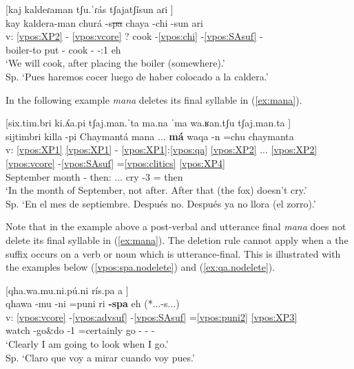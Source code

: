 \documentclass[output=paper]{langscibook}
\begin{document}
\ea \label{ex:spa}
    [kaj kaldeɾaman tʃu.ˈɾás tʃajatʃísun aɾi \downarrow] \\
    \glll {} kay kaldera-man churá -s\sout{pa} chaya -chi -sun ari \\
    v: \ref{vpos:XP2} - \ref{vpos:vcore} ? cook -\ref{vpos:chi} -\ref{vpos:SAsuf} - \\
    {} \Dem{} boiler-to put -\Gerund{} cook -\Caus{} -\Fut{}:1\Pl{} eh \\
    \glt  `We will cook, after placing the boiler (somewhere).'	\\ Sp. `Pues haremos cocer luego de haber colocado a la caldera.'
\z 

In the following example \textit{mana} deletes its final syllable in (\ref{ex:mana}).

\largerpage
\ea \label{ex:mana}
    [six.tim.bri ki.ʎa.pi tʃaj.man.ˈta ma.na ˈma wa.ʁan.tʃu tʃaj.man.ta \downarrow] \\ 
    \glll {} sijtimbri killa -pi Chaymantá mana ... \textbf{má} waqa -n =chu 		chaymanta  \\
    v: \ref{vpos:XP1} \ref{vpos:XP1} - \ref{vpos:XP1}:\ref{vpos:qa} \ref{vpos:XP2} ... \ref{vpos:XP2} \ref{vpos:vcore} -\ref{vpos:SAsuf} =\ref{vpos:clitics} \ref{vpos:XP4} \\
    {} September month -\Loc{} then:\Top{} \Neg{} ... \textbf{\Neg{}} cry -3\Sg{} =\Neg{} then \\
    \glt `In the month of   September, not after. After that (the fox) doesn't cry.' \\ Sp. `En el mes de septiembre. Después no. Después ya no llora (el zorro).'
\z 

Note that in the example above a post-verbal and utterance final \textit{mana} does not delete its final syllable in (\ref{ex:mana}). The deletion rule cannot apply when a the suffix occurs on a verb or noun which is utterance-final. This is illustrated with the examples below (\ref{vpos:spa.nodelete}) and (\ref{ex:qa.nodelete}).

\ea \label{vpos:spa.nodelete}
    [qha.wa.mu.ni.pú.ni rís.pa a \uparrow] \\
    \glll {} qhawa -mu -ni =puni ri \textbf{-spa} eh  (*...-s...) \\
    v: \ref{vpos:vcore} -\ref{vpos:advsuf} -\ref{vpos:SAsuf} =\ref{vpos:puni2} \ref{vpos:XP3} \\
    {} watch -go\&do -1\Sg{} =certainly go -\Gerund{} - - \\
    \glt `Clearly I am going to look when I go.' \\ Sp. `Claro que voy a mirar cuando voy pues.' 
\z 
\end{document}
